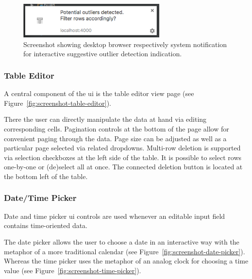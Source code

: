 \begin{figure}[h]
  \centering
  \includegraphics[width=0.66\textwidth]{figures/implementation/screenshot-notification}
  \caption{Screenshot showing desktop browser respectively system notification for interactive suggestive outlier detection indication.}
  \label{fig:screenshot-notification}
\end{figure}

\subsubsection{Table Editor}

A central component of the \gls{ui} is the table editor view page (see Figure~\ref{fig:screenshot-table-editor}).

There the user can directly manipulate the data at hand via editing corresponding cells.
Pagination controls at the bottom of the page allow for convenient paging through the data.
Page size can be adjusted as well as a particular page selected via related dropdowns.
Multi-row deletion is supported via selection checkboxes at the left side of the table.
It is possible to select rows one-by-one or (de)select all at once.
The connected deletion button is located at the bottom left of the table.

\subsubsection{Date/Time Picker}

Date and time picker \gls{ui} controls are used whenever an editable input field contains time-oriented data.

The date picker allows the user to choose a date in an interactive way with the metaphor of a more traditional calendar (see Figure~\ref{fig:screenshot-date-picker}).
Whereas the time picker uses the metaphor of an analog clock for choosing a time value (see Figure~\ref{fig:screenshot-time-picker}).

